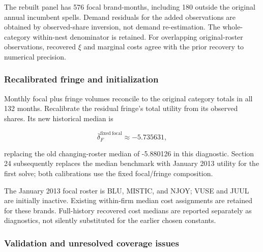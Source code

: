 \documentclass[10pt,]{article}
\begin{document}
The rebuilt panel has 576 focal brand-months, including 180 outside the
original annual incumbent spells. Demand residuals for the added
observations are obtained by observed-share inversion, not demand
re-estimation. The whole-category within-nest denominator is retained.
For overlapping original-roster observations, recovered \(\xi\) and
marginal costs agree with the prior recovery to numerical precision.

\subsubsection{Recalibrated fringe and
initialization}\label{recalibrated-fringe-and-initialization}

Monthly focal plus fringe volumes reconcile to the original category
totals in all 132 months. Recalibrate the residual fringe's total
utility from its observed shares. Its new historical median is

\[
\bar\delta_F^{\mathrm{fixed\ focal}}\approx -5.735631,
\]

replacing the old changing-roster median of -5.880126 in this
diagnostic. Section 24 subsequently replaces the median benchmark with
January 2013 utility for the first solve; both calibrations use the
fixed focal/fringe composition.

The January 2013 focal roster is BLU, MISTIC, and NJOY; VUSE and JUUL
are initially inactive. Existing within-firm median cost assignments are
retained for these brands. Full-history recovered cost medians are
reported separately as diagnostics, not silently substituted for the
earlier chosen constants.

\subsubsection{Validation and unresolved coverage
issues}\label{validation-and-unresolved-coverage-issues}
\end{document}

